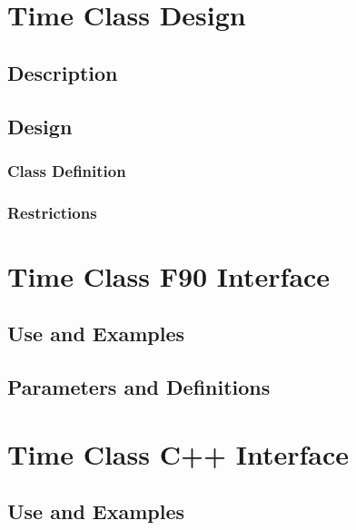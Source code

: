 \documentclass[]{article}
\begin{document}
\section{Time Class Design}

\subsection{Description}


\subsection{Design}


\subsubsection{Class Definition}


\subsubsection{Restrictions}


\section{Time Class F90 Interface}

\subsection{Use and Examples}


\subsection{Parameters and Definitions}
%



\section{Time Class C++ Interface}

\subsection{Use and Examples}

\end{document}
